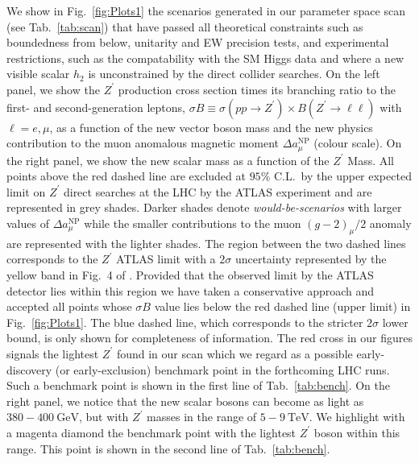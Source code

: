 We show in Fig.~\ref{fig:Plots1} the scenarios generated in our parameter space scan (see Tab.~\ref{tab:scan}) that have passed all theoretical constraints such as boundedness from below, unitarity and EW precision tests, and experimental restrictions, such as the compatability with the SM Higgs data and where a new visible scalar $h_2$ is unconstrained by the direct collider searches. On the left panel, we show the $Z^\prime$ production cross section times its branching ratio to the first- and second-generation leptons, $\sigma B \equiv \sigma \left( pp \to Z^\prime \right) \times B \left( Z^\prime \to \ell \ell \right) $ with $\ell = e,\mu$, as a function of the new vector boson mass and the new physics contribution to the muon anomalous magnetic moment $\Delta a^{\textrm{NP}}_\mu$ (colour scale). On the right panel, we show the new scalar mass as a function of the $Z^\prime$ Mass. All points above the red dashed line are excluded at $95\%$ C.L.~by the upper expected limit on $Z^\prime$ direct searches at the LHC by the ATLAS experiment and are represented in grey shades. Darker shades denote \textit{would-be-scenarios} with larger values of $\Delta a^{\textrm{NP}}_\mu$ while the smaller contributions to the muon $\left(g-2\right)_\mu / 2$ anomaly are represented with the lighter shades. The region between the two dashed lines corresponds to the $Z^\prime$ ATLAS limit with a $2\sigma$ uncertainty represented by the yellow band in Fig.~4 of \cite{Aaboud:2017buh}. Provided that the observed limit by the ATLAS detector lies within this region we have taken a conservative approach and accepted all points whose $\sigma B$ value lies below the red dashed line (upper limit) in Fig.~\ref{fig:Plots1}. The blue dashed line, which corresponds to the stricter $2 \sigma$ lower bound, is only shown for completeness of information. The red cross in our figures signals the lightest $Z^\prime$ found in our scan which we regard as a possible early-discovery (or early-exclusion) benchmark point in the forthcoming LHC runs. Such a benchmark point is shown in the first line of Tab.~\ref{tab:bench}. On the right panel, we notice that the new scalar bosons can become as light as $380 - 400~\textrm{GeV}$, but with $Z^\prime$ masses in the range of $5 - 9~\textrm{TeV}$. We highlight with a magenta diamond the benchmark point with the lightest $Z^\prime$ boson within this range. This point is shown in the second line of Tab.~\ref{tab:bench}.
%
